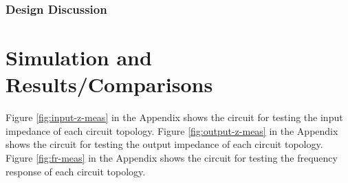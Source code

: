\documentclass[conference]{IEEEtran}
\begin{document}
\subsubsection{Design Discussion}

\section{Simulation and Results/Comparisons}
Figure \ref{fig:input-z-meas} in the Appendix shows the circuit for testing the input impedance of each circuit topology.  Figure \ref{fig:output-z-meas} in the Appendix shows the circuit for testing the output impedance of each circuit topology.  Figure \ref{fig:fr-meas} in the Appendix shows the circuit for testing the frequency response of each circuit topology.\\
\end{document}
